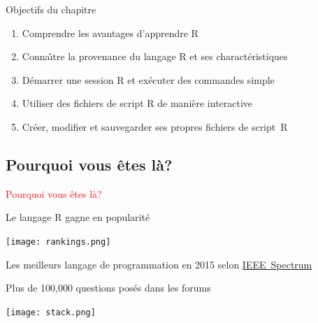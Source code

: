 \documentclass[11pt]{beamer}\usepackage[]{graphicx}\usepackage[]{color}
\begin{document}
\begin{frame}[plain]
\hspace*{-1.0cm}\parbox[t]{\textwidth}{
\begin{block}{Objectifs du chapitre}
\begin{enumerate}
\item Comprendre les avantages d'apprendre R
\item Conna\^{\i}tre la provenance du langage R et ses charact\'{e}ristiques
\item D\'{e}marrer une session R et ex\'{e}cuter des commandes simple
\item Utiliser des fichiers de script R de mani\`{e}re interactive
\item Cr\'{e}er, modifier et sauvegarder ses propres fichiers de \mbox{script R}
\end{enumerate}
\end{block}
}
\end{frame}



\subsection{Pourquoi vous \^{e}tes l\`{a}?}

\begin{frame}
 \begin{center}
  \Huge{\textcolor{red}{Pourquoi vous \^{e}tes l\`{a}?}}
 \end{center}
\end{frame}


\begin{frame}{Le langage R gagne en popularit\'{e}}

\vspace{0.1in}

\begin{center}
\texttt{[image: rankings.png]}
\end{center}

\vspace{0.2in}

Les meilleurs langage de programmation en 2015 selon \href{http://spectrum.ieee.org/computing/software/the-2015-top-ten-programming-languages}{\mbox{IEEE Spectrum}} \\
\end{frame}


\begin{frame}{Plus de 100,000 questions pos\'{e}s dans les forums}

\texttt{[image: stack.png]}
\newline
\vspace{0.1in}
\end{frame}
\end{document}
